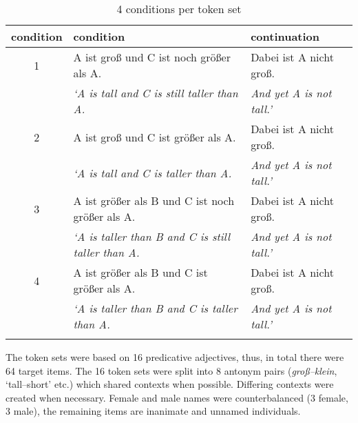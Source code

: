 \documentclass[output=paper,
modfonts
]{langscibook}
\begin{document}
\begin{table}[H]\scriptsize
\begin{tabular}{cll}
\lsptoprule
condition & condition & continuation \\
\midrule \midrule 
1 & A ist groß \hspace{25pt} und C ist noch größer als A. & Dabei ist A nicht groß. \\
 & \textit{`A is tall \hspace{32pt} and C is \hspace{0.4pt} still \hspace{2pt} taller than A.} & \textit{And yet A is not tall.'} \\
\midrule
2 & A ist groß \hspace{25pt} und C ist \hspace{16pt} größer als A. & Dabei ist A nicht groß.  \\
 & \textit{`A is tall \hspace{32pt} and C is \hspace{19pt} taller than A.} & \textit{And yet A is not tall.'} \\
\midrule 
3 & A ist größer als B \hspace{0.65pt} und C ist noch größer als A. & Dabei ist A nicht groß.  \\
 & \textit{`A is taller than B \hspace{2pt} and C is \hspace{0.4pt} still \hspace{2pt} taller than A.} & \textit{And yet A is not tall.'}  \\
\midrule
4 & A ist größer als B \hspace{0.65pt} und C ist \hspace{16pt} größer als A. & Dabei ist A nicht groß.   \\
 & \textit{`A is taller than B \hspace{2pt} and C is \hspace{19pt} taller than A.} & \textit{And yet A is not tall.'}  \\
\lspbottomrule
\end{tabular}
\caption{4 conditions per token set}
\label{tab:4_conds}
\end{table}

The token sets were based on 16 predicative adjectives, thus, in total there were 64 target items. The 16 token sets were split into 8 antonym pairs (\textit{groß--klein}, `tall--short' etc.) which shared contexts when possible. Differing contexts were created when necessary. Female and male names were counterbalanced (3 female, 3 male), the remaining items are inanimate and unnamed individuals.
\end{document}
